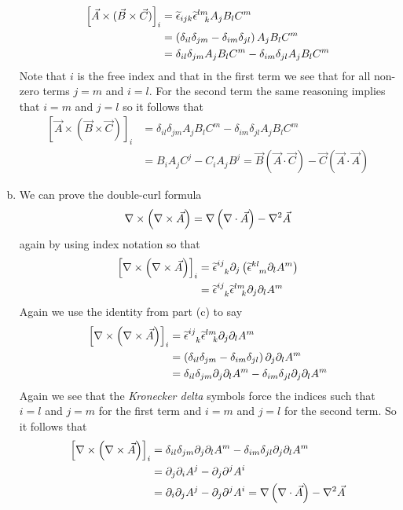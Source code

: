 \documentclass[11pt]{article}
\numberwithin{equation}{section}
\begin{document}
\begin{enumerate}[(a)]
\begin{align*}
\left[\vec{A}\times(\vec{B}\times\vec{C})\right]_i &= \widetilde{\epsilon}_{ijk}\widetilde{\epsilon}^{lm}_{\ \ k}A_jB_lC^m\\
&= \left(\delta_{il}\delta_{jm} - \delta_{im}\delta_{jl}\right)A_jB_lC^m\\
&= \delta_{il}\delta_{jm}A_jB_lC^m - \delta_{im}\delta_{jl}A_jB_lC^m
\end{align*}
Note that $i$ is the free index and that in the first term we see that for all non-zero terms $j=m$ and $i=l$. For the second term the same reasoning implies that $i=m$ and $j=l$ so it follows that
\begin{align*}
\left[\vec{A}\times(\vec{B}\times\vec{C})\right]_i  &= \delta_{il}\delta_{jm}A_jB_lC^m - \delta_{im}\delta_{jl}A_jB_lC^m\\
&= B_iA_jC^j - C_iA_jB^j = \vec{B}\left(\vec{A}\cdot\vec{C}\right) - \vec{C}\left(\vec{A}\cdot\vec{A}\right)
\end{align*}

\item
We can prove the double-curl formula 
$$\bold\nabla\times\left(\bold\nabla\times\vec{A}\right) = \bold\nabla\left(\bold\nabla\cdot\vec{A}\right) - \bold\nabla^2\vec{A}$$
again by using index notation so that
\begin{align*}
\left[\grad\times\left(\grad\times\vec{A}\right)\right]_i &= \levi^{ij}_{\ \ k}\partial_j\left(\levi^{kl}_{\ \ m}\partial_lA^m\right)\\
&= \levi^{ij}_{\ \ k}\levi^{lm}_{\ \ k}\partial_j\partial_lA^m
\end{align*}
Again we use the identity from part (c) to say
\begin{align*}
\left[\bold\nabla\times\left(\bold\nabla\times\vec{A}\right)\right]_i &= \widetilde{\epsilon}^{ij}_{\ \ k}\widetilde{\epsilon}^{lm}_{\ \ k}\partial_j\partial_lA^m\\
&= \left(\delta_{il}\delta_{jm} - \delta_{im}\delta_{jl}\right)\partial_j\partial_lA^m\\
&= \delta_{il}\delta_{jm}\partial_j\partial_lA^m - \delta_{im}\delta_{jl}\partial_j\partial_lA^m
\end{align*}
Again we see that the \emph{Kronecker delta} symbols force the indices such that $i=l$ and $j=m$ for the first term and $i=m$ and $j=l$ for the second term. So it follows that
\begin{align*}
\left[\bold\nabla\times\left(\bold\nabla\times\vec{A}\right)\right]_i &= \delta_{il}\delta_{jm}\partial_j\partial_lA^m - \delta_{im}\delta_{jl}\partial_j\partial_lA^m\\
&= \partial_j\partial_iA^j - \partial_j\partial^jA^i\\
&= \partial_i\partial_jA^j - \partial_j\partial^jA^i = \bold\nabla\left(\bold\nabla\cdot\vec{A}\right) - \bold\nabla^2\vec{A}
\end{align*}


\end{enumerate}
\end{document}
